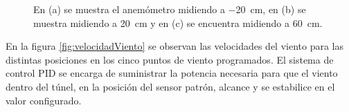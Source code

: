 \begin{figure}[H]
\begin{minipage}[b]{0.33\textwidth}
        \centering
    \end{minipage}
    \begin{minipage}[b]{0.5\textwidth}
        \centering
    \end{minipage}
    
    \caption{En (a) se muestra el anemómetro midiendo a \SI{-20}{\centi\meter}, en (b) se muestra midiendo a \SI{20}{\centi\meter} y en (c) se encuentra midiendo a \SI{60}{\centi\meter}.}
    \label{fig:caracterPuntos}
\end{figure}

En la figura \ref{fig:velocidadViento} se observan las velocidades del viento para las distintas posiciones en los cinco puntos de viento programados. El sistema de control PID se encarga de suministrar la potencia necesaria para que el viento dentro del túnel, en la posición del sensor patrón, alcance y se estabilice en el valor configurado.

